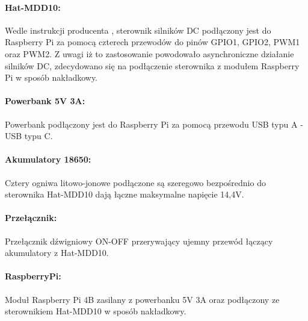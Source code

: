 \documentclass[a4paper,twoside,12pt]{book}
\begin{document}
\paragraph{Hat-MDD10:} Wedle instrukcji producenta \cite{bib:hatmdd10manual}, sterownik silników DC podłączony jest do Raspberry Pi za pomocą czterech przewodów do pinów GPIO1, GPIO2, PWM1 oraz PWM2. Z uwagi iż to zastosowanie powodowało asynchroniczne działanie silników DC, zdecydowano się na podłączenie sterownika z modułem Raspberry Pi w sposób nakładkowy.
\paragraph{Powerbank 5V 3A:} Powerbank podłączony jest do Raspberry Pi za pomocą przewodu USB typu A - USB typu C.
\paragraph{Akumulatory 18650:} Cztery ogniwa litowo-jonowe podłączone są szeregowo bezpośrednio do sterownika Hat-MDD10 dają łączne maksymalne napięcie 14,4V.
\paragraph{Przełącznik:} Przełącznik dźwigniowy ON-OFF przerywający ujemny przewód łączący akumulatory z Hat-MDD10.
\paragraph{RaspberryPi:} Moduł Raspberry Pi 4B zasilany z powerbanku 5V 3A oraz podłączony ze sterownikiem Hat-MDD10 w sposób nakładkowy.
\newpage
\end{document}
